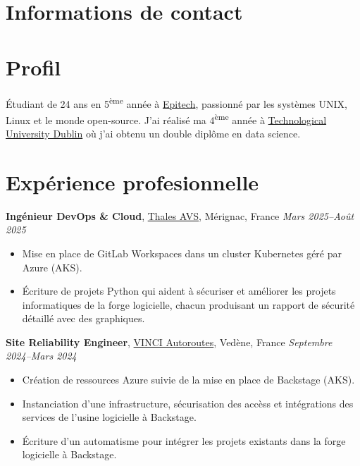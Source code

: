 \documentclass[margin,line]{../res}
\begin{document}
\newcommand{\myname}{Théo BORI}
\newlength{\mynamewidth}
\settowidth{\mynamewidth}{\namefont\myname}

\name{\hspace*{0.5\textwidth}\hspace{-0.5\mynamewidth} \myname \vspace*{.1in}}
\thispagestyle{empty}

\begin{resume}

	\section{\sc Informations de contact}
	


	\vspace{-1em}

	\section{\sc Profil}
	Étudiant de 24 ans en 5\textsuperscript{ème} année à \href{https://www.epitech.eu/}{Epitech}, passionné par les systèmes UNIX, Linux et le monde open-source. J'ai réalisé ma 4\textsuperscript{ème} année à \href{https://www.tudublin.ie/}{Technological University Dublin} où j'ai obtenu un double diplôme en data science.

	\section{\sc Expérience profesionnelle}
	 {\bf Ingénieur DevOps \& Cloud}, \href{https://www.thalesgroup.com/fr}{Thales AVS}, Mérignac, France
	\hfill {\it Mars 2025--Août 2025}
	\vspace*{.05in}
	\begin{itemize}
		\item Mise en place de GitLab Workspaces dans un cluster Kubernetes géré par Azure (AKS).
		\item \'Ecriture de projets Python qui aident à sécuriser et améliorer les projets informatiques de la forge logicielle, chacun produisant un rapport de sécurité détaillé avec des graphiques.
	\end{itemize}

	{\bf Site Reliability Engineer}, \href{https://www.vinci-autoroutes.com}{VINCI Autoroutes}, Vedène, France
	\hfill {\it Septembre 2024--Mars 2024}
	\vspace*{.05in}
	\begin{itemize}
		\item Création de ressources Azure suivie de la mise en place de Backstage (AKS).
		\item Instanciation d'une infrastructure, sécurisation des accèss et intégrations des services de l'usine logicielle à Backstage.
		\item \'Ecriture d'un automatisme pour intégrer les projets existants dans la forge logicielle à Backstage.
	\end{itemize}


\end{resume}
\end{document}
